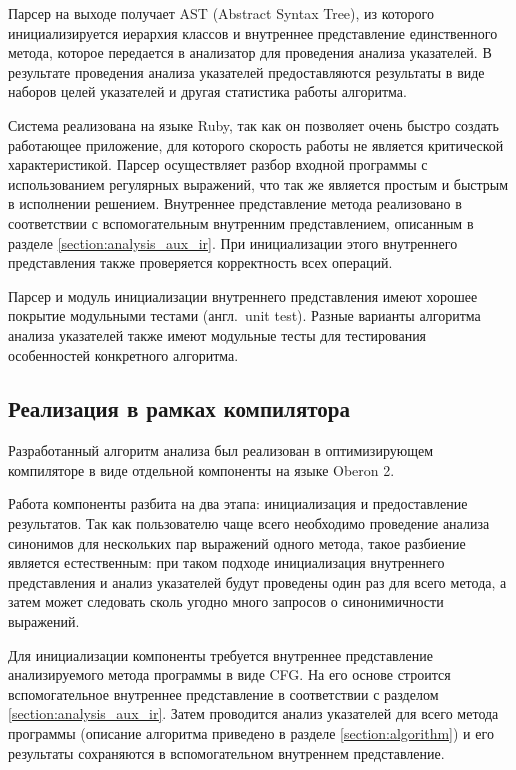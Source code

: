 \documentclass[14pt,titlepage]{extarticle}
\newcommand{\eng}[1]{{\English#1}}
\newcommand{\engdef}[1]{(англ.~\eng{#1})}
\begin{document}
      Парсер на выходе получает AST (\eng{Abstract Syntax Tree}), из которого
      инициализируется иерархия классов и внутреннее представление
      единственного метода, которое передается в анализатор для проведения
      анализа указателей. В результате проведения анализа указателей
      предоставляются результаты в виде наборов целей указателей и другая
      статистика работы алгоритма.

      Система реализована на языке Ruby, так как он позволяет очень быстро
      создать работающее приложение, для которого скорость работы не является
      критической характеристикой. Парсер осуществляет разбор входной
      программы с использованием регулярных выражений, что так же является
      простым и быстрым в исполнении решением. Внутреннее представление метода
      реализовано в соответствии с вспомогательным внутренним представлением,
      описанным в разделе \ref{section:analysis_aux_ir}.
      При инициализации этого внутреннего представления также проверяется
      корректность всех операций.

      Парсер и модуль инициализации внутреннего представления имеют хорошее
      покрытие модульными тестами \engdef{unit test}. Разные варианты
      алгоритма анализа указателей также имеют модульные тесты для тестирования
      особенностей конкретного алгоритма.

    \subsection{Реализация в рамках компилятора}

      Разработанный алгоритм анализа был реализован в оптимизирующем
      компиляторе в виде отдельной компоненты на языке \eng{Oberon} 2.

      Работа компоненты разбита на два этапа: инициализация и предоставление
      результатов. Так как пользователю чаще всего необходимо проведение
      анализа синонимов для нескольких пар выражений одного метода, такое
      разбиение является естественным: при таком подходе инициализация
      внутреннего представления и анализ указателей будут проведены один раз
      для всего метода, а затем может следовать сколь угодно много запросов о
      синонимичности выражений.

      Для инициализации компоненты требуется внутреннее представление
      анализируемого метода программы в виде CFG. На его основе строится
      вспомогательное внутреннее представление в соответствии с разделом
      \ref{section:analysis_aux_ir}. Затем проводится анализ указателей для
      всего метода программы (описание алгоритма приведено в разделе
      \ref{section:algorithm}) и его результаты сохраняются в вспомогательном
      внутреннем представление.
\end{document}
